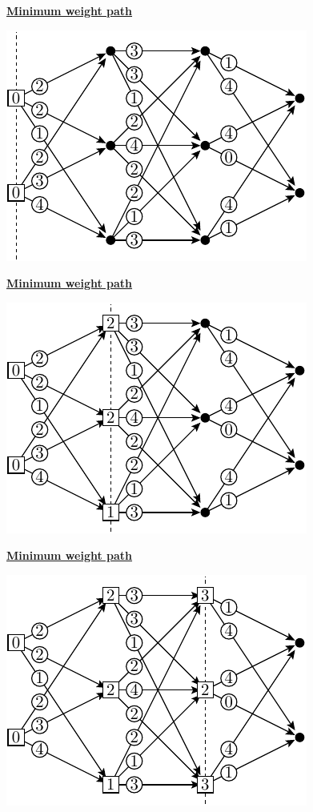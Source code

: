 \documentclass[11pt]{article}
\def\heading #1{\centerline{\underline{\bf\LARGE #1}}}
\begin{document}
\newpage %

\heading{Minimum weight path}
\centerline{\includegraphics[]{pic-minpath-1.pdf}}

\newpage %

\heading{Minimum weight path}
\centerline{\includegraphics[]{pic-minpath-2.pdf}}

\newpage %

\heading{Minimum weight path}
\centerline{\includegraphics[]{pic-minpath-3.pdf}}
\end{document}

